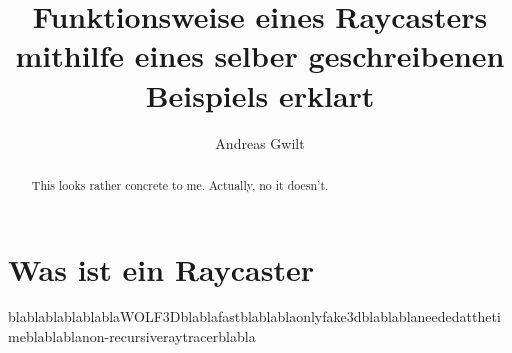 \documentclass[a4paper,11pt]{article}
\title{Funktionsweise eines Raycasters mithilfe eines selber geschreibenen Beispiels erklart}
\author{Andreas Gwilt}
\begin{document}
\maketitle
\tableofcontents

\begin{abstract}
This looks rather concrete to me. Actually, no it doesn't.
\end{abstract}

\section{Was ist ein Raycaster}
blablablablablablaWOLF3Dblablafastblablablaonlyfake3dblablablaneededatthetimeblablablanon-recursiveraytracerblabla
\end{document}

